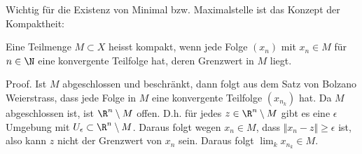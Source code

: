\documentclass[letterpaper,10pt,english]{jupyterBook}
\begin{document}
Wichtig für die Existenz von Minimal  bzw. Maximalstelle ist das Konzept der Kompaktheit:
\label{stetigkeit/eigenschaften:definition-2}
\begin{definition}{}{}



Eine Teilmenge \(M \subset X\) heisst kompakt, wenn jede Folge \((x_n)\) mit \(x_n \in M\) für \(n \in \N\) eine konvergente Teilfolge hat, deren Grenzwert in \(M\) liegt.
\end{definition}



\begin{emphBox}{}{}
Proof.  Ist \(M\) abgeschlossen und beschränkt, dann folgt aus dem Satz von Bolzano Weierstrass, dass jede Folge in \(M\) eine konvergente Teilfolge \((x_{n_k})\) hat. Da \(M\) abgeschlossen ist, ist \(\R^n \setminus M\) offen. D.h. für jedes \(z \in \R^n \setminus M\) gibt es eine \(\epsilon\) Umgebung mit \(U_\epsilon \subset \R^n \setminus M\). Daraus folgt wegen \(x_n \in M\), dass \(\Vert x_n - z \Vert \geq \epsilon\) ist, also kann \(z\) nicht der Grenzwert von \(x_n\) sein. Daraus folgt \(\lim_k x_{n_k} \in M\).


\end{emphBox}
\end{document}
